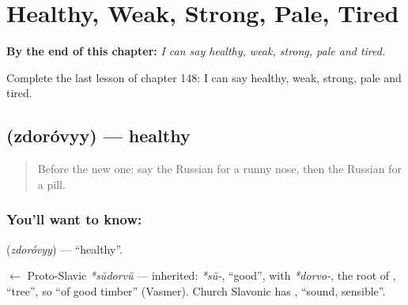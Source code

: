 
\chapter{Healthy, Weak, Strong, Pale, Tired}
\label{ch:ru-healthy-weak-strong-pale-tired}

\begin{chapteropening}
\textbf{By the end of this chapter:} \emph{I can say healthy, weak, strong, pale and tired.}

Complete the last lesson of chapter 148: I can say healthy, weak, strong, pale and tired.
\end{chapteropening}

\section[\texorpdfstring{\ru{здоровый} (zdoróvyy)}{здоровый (zdoróvyy)}]{ (zdoróvyy) — healthy}

\label{lesson:RU-C148-zdorovyy}



\begin{quote}
Before the new one: say the Russian for a runny nose, then the Russian for a pill.
\end{quote}

\subsection*{You'll want to know: }
\textbf{} (\emph{zdoróvyy}) — \textquotedblleft{}healthy\textquotedblright{}.

\begin{cousinweb}
\textbf{} $\leftarrow$ Proto-Slavic \emph{*sŭdorvŭ} — inherited: \emph{*sŭ-}, \textquotedblleft{}good\textquotedblright{}, with \emph{*dorvo-}, the root of \emph{}, \textquotedblleft{}tree\textquotedblright{}, so \textquotedblleft{}of good timber\textquotedblright{} (Vasmer). Church Slavonic has \emph{}, \textquotedblleft{}sound, sensible\textquotedblright{}.
\end{cousinweb}

